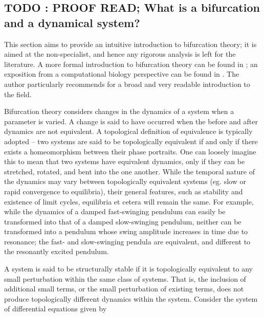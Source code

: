 \documentclass[a4paper,twoside]{article}
\begin{document}
\subsection{{\bfseries\sffamily TODO} : PROOF READ; What is a bifurcation and a dynamical system?}
\label{sec:org1d76f44}
This section aims to provide an intuitive introduction to bifurcation theory; it is aimed at the non-specialist, and hence any rigorous analysis is left for the literature.
A more formal introduction to bifurcation theory can be found in \cite{strogatz2018nonlinear,guckenheimer2013nonlinear,kuznetsov2013elements}; an exposition from a computational biology perspective can be found in \cite{beuter2003nonlinear,hoppensteadt2012weakly,izhikevich2007dynamical}.
The author particularly recommends \cite{strogatz2018nonlinear} for a broad and very readable introduction to the field.

Bifurcation theory considers changes in the dynamics of a system when a parameter is varied.
A change is said to have occurred when the before and after dynamics are not equivalent.
A topological definition of equivalence is typically adopted -- two systems are said to be topologically equivalent if and only if there exists a homeomorphism between their phase portraits.
One can loosely imagine this to mean that two systems have equivalent dynamics, only if they can be stretched, rotated, and bent into the one another.
While the temporal nature of the dynamics may vary between topologically equivalent systems (eg. slow or rapid convergence to equilibria), their general features, such as stability and existence of limit cycles, equilibria et cetera will remain the same.
For example, while the dynamics of a damped fast-swinging pendulum can easily be transformed into that of a damped slow-swinging pendulum, neither can be transformed into a pendulum whose swing amplitude increases in time due to resonance; the fast- and slow-swinging pendula are equivalent, and different to the resonantly excited pendulum.

A system is said to be structurally stable if it is topologically equivalent to any small perturbation within the same class of systems.
That is, the inclusion of additional small terms, or the small perturbation of existing terms, does not produce topologically different dynamics within the system.
Consider the system of differential equations given by
\end{document}

